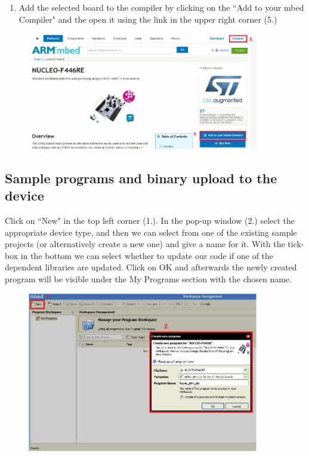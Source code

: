 \documentclass[a4paper]{article}
\begin{document}
\begin{enumerate}[resume]
    \item Add the selected board to the compiler by clicking on the ``Add to your mbed Compiler" and the open it using the
          link in the upper right corner (5.)
\end{enumerate}
\begin{figure}[H]
    \centering
    \includegraphics[width=0.9\textwidth]{figures/mbed-compiler.png}
\end{figure}

\subsection{Sample programs and binary upload to the device}

Click on ``New" in the top left corner (1.). In the pop-up window (2.) select the appropriate device type, and then we
can select from one of the existing sample projects (or alternatively create a new one) and give a name for it. With
the tick-box in the bottom we can select whether to update our code if one of the dependent libraries are updated.
Click on OK and afterwards the newly created program will be visible under the My Programs section with the chosen
name.
\begin{figure}[H]
    \centering
    \includegraphics[width=0.9\textwidth]{figures/mbed-new.png}
\end{figure}
\end{document}
